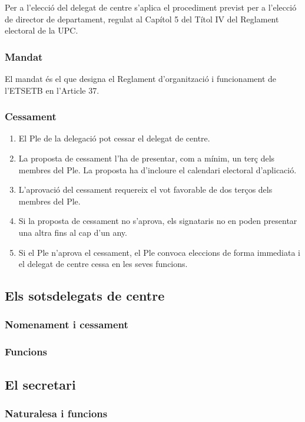 \documentclass[a4paper,12pt]{article}
\renewcommand*{\thesubsubsection}{\arabic{subsubsection}}
\begin{document}
Per a l'elecció del delegat de centre s’aplica el procediment previst per a l'elecció de director de departament, regulat al Capítol 5 del Títol IV del Reglament electoral de la UPC.

\subsubsection{Mandat}
El mandat és el que designa el Reglament d’organització i funcionament de l'ETSETB en l'Article 37.

\subsubsection{Cessament}
\begin{enumerate}[\thesubsubsection.1]
	\item El Ple de la delegació pot cessar el delegat de centre.
	\item La proposta de cessament l'ha de presentar, com a mínim, un terç dels membres del Ple. La proposta ha d'incloure el calendari electoral d'aplicació.
	\item L'aprovació del cessament requereix el vot favorable de dos terços dels membres del Ple.
	\item Si la proposta de cessament no s'aprova, els signataris no en poden presentar una altra fins al cap d'un any.
	\item Si el Ple n'aprova el cessament, el Ple convoca eleccions de forma immediata i el delegat de centre cessa en les seves funcions.
\end{enumerate}


\subsection{Els sotsdelegats de centre}
\subsubsection{Nomenament i cessament}
\subsubsection{Funcions}

\subsection{El secretari}
\subsubsection{Naturalesa i funcions}
\end{document}
